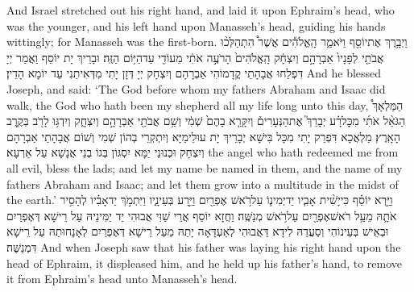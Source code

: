{And Israel stretched out his right hand, and laid it upon Ephraim’s head, who was the younger, and his left hand upon Manasseh’s head, guiding his hands wittingly; for Manasseh was the first-born.}{}
{וַיְבָ֥רֶךְ אֶת\maqqaf יוֹסֵ֖ף וַיֹּאמַ֑ר הָֽאֱלֹהִ֡ים אֲשֶׁר֩ הִתְהַלְּכ֨וּ אֲבֹתַ֤י לְפָנָיו֙ אַבְרָהָ֣ם וְיִצְחָ֔ק הָֽאֱלֹהִים֙ הָרֹעֶ֣ה אֹתִ֔י מֵעוֹדִ֖י עַד\maqqaf הַיּ֥וֹם הַזֶּֽה׃}
{וּבָרֵיךְ יָת יוֹסֵף וַאֲמַר יְיָ דִּפְלַחוּ אֲבָהָתַי קֳדָמוֹהִי אַבְרָהָם וְיִצְחָק יְיָ דְּזָן יָתִי מִדְּאִיתַנִי עַד יוֹמָא הָדֵין׃}
{And he blessed Joseph, and said: ‘The God before whom my fathers Abraham and Isaac did walk, the God who hath been my shepherd all my life long unto this day,}{}
{הַמַּלְאָךְ֩ הַגֹּאֵ֨ל אֹתִ֜י מִכׇּל\maqqaf רָ֗ע יְבָרֵךְ֮ אֶת\maqqaf הַנְּעָרִים֒ וְיִקָּרֵ֤א בָהֶם֙ שְׁמִ֔י וְשֵׁ֥ם אֲבֹתַ֖י אַבְרָהָ֣ם וְיִצְחָ֑ק וְיִדְגּ֥וּ לָרֹ֖ב בְּקֶ֥רֶב הָאָֽרֶץ׃}
{מַלְאֲכָא דִּפְרַק יָתִי מִכָּל בִּישָׁא יְבָרֵיךְ יָת עוּלֵימַיָּא וְיִתְקְרֵי בְהוֹן שְׁמִי וְשׁוֹם אֲבָהָתַי אַבְרָהָם וְיִצְחָק וּכְנוּנֵי יַמָּא יִסְגּוֹן בְּגוֹ בְנֵי אֲנָשָׁא עַל אַרְעָא׃}
{the angel who hath redeemed me from all evil, bless the lads; and let my name be named in them, and the name of my fathers Abraham and Isaac; and let them grow into a multitude in the midst of the earth.’}{}
{וַיַּ֣רְא יוֹסֵ֗ף כִּי\maqqaf יָשִׁ֨ית אָבִ֧יו יַד\maqqaf יְמִינ֛וֹ עַל\maqqaf רֹ֥אשׁ אֶפְרַ֖יִם וַיֵּ֣רַע בְּעֵינָ֑יו וַיִּתְמֹ֣ךְ יַד\maqqaf אָבִ֗יו לְהָסִ֥יר אֹתָ֛הּ מֵעַ֥ל רֹאשׁ\maqqaf אֶפְרַ֖יִם עַל\maqqaf רֹ֥אשׁ מְנַשֶּֽׁה׃}
{וַחֲזָא יוֹסֵף אֲרֵי שַׁוִּי אֲבוּהִי יַד יַמִּינֵיהּ עַל רֵישָׁא דְּאֶפְרַיִם וּבְאֵישׁ בְּעֵינוֹהִי וְסַעֲדַהּ לִידָא דַּאֲבוּהִי לְאַעְדָּאָה יָתַהּ מֵעַל רֵישָׁא דְּאֶפְרַיִם לְאָנָחוּתַהּ עַל רֵישָׁא דִּמְנַשֶּׁה׃}
{And when Joseph saw that his father was laying his right hand upon the head of Ephraim, it displeased him, and he held up his father’s hand, to remove it from Ephraim’s head unto Manasseh’s head.}{}
